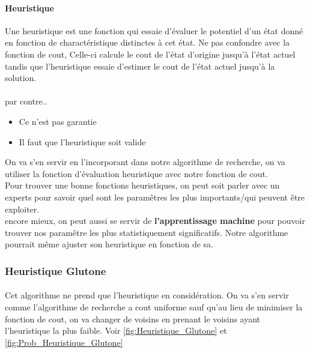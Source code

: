 \documentclass{book}
\begin{document}
\paragraph{Heuristique}
Une heuristique est une fonction qui essaie d'évaluer le potentiel d'un état donné en fonction de charactéristique distinctes à cet état. Ne pas confondre avec la fonction de cout, Celle-ci calcule le cout de l'état d'origine jusqu'à l'état actuel tandis que l'heuristique essaie d'estimer le cout de l'état actuel jusqu'à la solution.
\paragraph{}

par contre..
\begin{itemize}
\item Ce n'est pas garantie
\item Il faut que l'heuristique soit valide
\end{itemize}

On va s'en servir en l'incorporant dans notre algorithme de recherche, on va utiliser la fonction d'évaluation heuristique avec notre fonction de cout.\\

Pour trouver une bonne fonctions heuristiques, on peut soit parler avec un experts pour savoir quel sont les paramêtres les plus importants/qui peuvent être exploiter. \\

encore mieux, on peut aussi se servir de \textbf{l'apprentissage machine} pour pouvoir trouver nos paramêtre les plus statistiquement significatifs. Notre algorithme pourrait même ajuster son heuristique en fonction de sa.

\subsubsection{Heuristique Glutone}
\paragraph{}
Cet algorithme ne prend que l'heuristique en considération. On va s'en servir comme l'algorithme de recherche a cout uniforme sauf qu'au lieu de minimiser la fonction de cout, on va changer de voisins en prenant le voisins ayant l'heuristique la plus faible. Voir \ref{fig:Heuristique_Glutone} et \ref{fig:Prob_Heuristique_Glutone}
\end{document}
